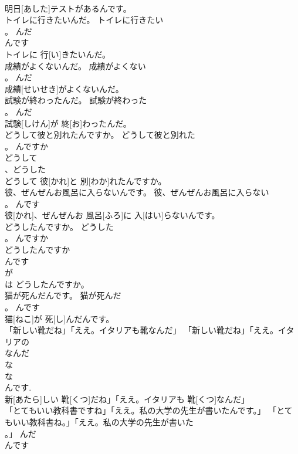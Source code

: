 \documentclass[8pt]{extreport}
\begin{document}
\begin{CJK}{UTF8}{min}
\\	明日[あした]テストがあるんです。	
\\	トイレに行きたいんだ。	トイレに行きたい
\\	。	んだ	
\\	んです 
\\	トイレに 行[い]きたいんだ。	
\\	成績がよくないんだ。	成績がよくない
\\	。	んだ	
\\	成績[せいせき]がよくないんだ。	
\\	試験が終わったんだ。	試験が終わった
\\	。	んだ	
\\	試験[しけん]が 終[お]わったんだ。	
\\	どうして彼と別れたんですか。	どうして彼と別れた
\\	。	んですか	
\\	どうして 
\\	、どうした 
\\	どうして 彼[かれ]と 別[わか]れたんですか。	
\\	彼、ぜんぜんお風呂に入らないんです。	彼、ぜんぜんお風呂に入らない
\\	。	んです	
\\	彼[かれ]、ぜんぜんお 風呂[ふろ]に 入[はい]らないんです。	
\\	どうしたんですか。	どうした
\\	。	んですか	
\\	どうしたんですか 
\\	んです 
\\	が 
\\	は	どうしたんですか。	
\\	猫が死んだんです。	猫が死んだ
\\	。	んです	
\\	猫[ねこ]が 死[し]んだんです。	
\\	「新しい靴だね」「ええ。イタリアも靴なんだ」	「新しい靴だね」「ええ。イタリアの
\\	なんだ	
\\	な 
\\	な 
\\	んです.	
\\	新[あたら]しい 靴[くつ]だね」「ええ。イタリアも 靴[くつ]なんだ」	
\\	「とてもいい教科書ですね」「ええ。私の大学の先生が書いたんです。」	「とてもいい教科書ね。」「ええ。私の大学の先生が書いた
\\	。」	んだ	
\\	んです 

\end{CJK}
\end{document}
